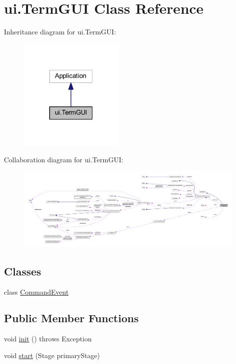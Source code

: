 \hypertarget{classui_1_1_term_g_u_i}{}\section{ui.\+Term\+G\+UI Class Reference}
\label{classui_1_1_term_g_u_i}


Inheritance diagram for ui.\+Term\+G\+UI\+:
\nopagebreak
\begin{figure}[H]
\begin{center}
\leavevmode
\includegraphics[width=145pt]{classui_1_1_term_g_u_i__inherit__graph}
\end{center}
\end{figure}


Collaboration diagram for ui.\+Term\+G\+UI\+:
\nopagebreak
\begin{figure}[H]
\begin{center}
\leavevmode
\includegraphics[width=350pt]{classui_1_1_term_g_u_i__coll__graph}
\end{center}
\end{figure}
\subsection*{Classes}
\begin{DoxyCompactItemize}
\item 
class \mbox{\hyperlink{classui_1_1_term_g_u_i_1_1_command_event}{Command\+Event}}
\end{DoxyCompactItemize}
\subsection*{Public Member Functions}
\begin{DoxyCompactItemize}
\item 
void \mbox{\hyperlink{classui_1_1_term_g_u_i_a25ee2d1053a7a06f43524b4ffa84161e}{init}} ()  throws Exception 
\item 
void \mbox{\hyperlink{classui_1_1_term_g_u_i_a46859d29835a7053b48e49f27b377f76}{start}} (Stage primary\+Stage)
\end{DoxyCompactItemize}
